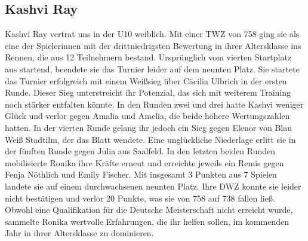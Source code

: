 \documentclass[a4paper,ngerman]{tui-algo-seminar}
\begin{document}
\subsection{Kashvi Ray}
Kashvi Ray vertrat uns in der U10 weiblich. Mit einer TWZ von 758 ging sie als eine der Spielerinnen mit der drittniedrigsten Bewertung in ihrer Altersklasse ins Rennen, die aus 12 Teilnehmern bestand. Ursprünglich vom vierten Startplatz aus startend, beendete sie das Turnier leider auf dem neunten Platz. Sie startete das Turnier erfolgreich mit einem Weißsieg über Cäcilia Ulbrich in der ersten Runde. Dieser Sieg unterstreicht ihr Potenzial, das sich mit weiterem Training noch stärker entfalten könnte. In den Runden zwei und drei hatte Kashvi weniger Glück und verlor gegen Amalia und Amelia, die beide höhere Wertungszahlen hatten. In der vierten Runde gelang ihr jedoch ein Sieg gegen Elenor von Blau Weiß Stadtilm, der das Blatt wendete. Eine unglückliche Niederlage erlitt sie in der fünften Runde gegen Julia aus Saalfeld. In den letzten beiden Runden mobilisierte Ronika ihre Kräfte erneut und erreichte jeweils ein Remis gegen Fenja Nöthlich und Emily Fischer. Mit insgesamt 3 Punkten aus 7 Spielen landete sie auf einem durchwachsenen neunten Platz. Ihre DWZ konnte sie leider nicht bestätigen und verlor 20 Punkte, was sie von 758 auf 738 fallen ließ. Obwohl eine Qualifikation für die Deutsche Meisterschaft nicht erreicht wurde, sammelte Ronika wertvolle Erfahrungen, die ihr helfen sollen, im kommenden Jahr in ihrer Altersklasse zu dominieren.
\end{document}
